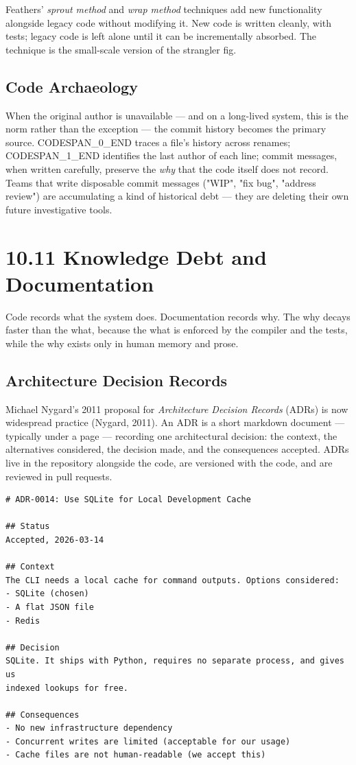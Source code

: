 \documentclass[11pt,a4paper]{book}
\begin{document}
Feathers' \textit{sprout method} and \textit{wrap method} techniques add new functionality alongside legacy code without modifying it. New code is written cleanly, with tests; legacy code is left alone until it can be incrementally absorbed. The technique is the small-scale version of the strangler fig.

\subsection{Code Archaeology}

When the original author is unavailable --- and on a long-lived system, this is the norm rather than the exception --- the commit history becomes the primary source. CODESPAN\_0\_END traces a file's history across renames; CODESPAN\_1\_END identifies the last author of each line; commit messages, when written carefully, preserve the \textit{why} that the code itself does not record. Teams that write disposable commit messages ("WIP", "fix bug", "address review") are accumulating a kind of historical debt --- they are deleting their own future investigative tools.

\medskip

\section{10.11 Knowledge Debt and Documentation}

Code records what the system does. Documentation records why. The why decays faster than the what, because the what is enforced by the compiler and the tests, while the why exists only in human memory and prose.

\subsection{Architecture Decision Records}

Michael Nygard's 2011 proposal for \textit{Architecture Decision Records} (ADRs) is now widespread practice (Nygard, 2011). An ADR is a short markdown document --- typically under a page --- recording one architectural decision: the context, the alternatives considered, the decision made, and the consequences accepted. ADRs live in the repository alongside the code, are versioned with the code, and are reviewed in pull requests.

\begin{lstlisting}
# ADR-0014: Use SQLite for Local Development Cache

## Status
Accepted, 2026-03-14

## Context
The CLI needs a local cache for command outputs. Options considered:
- SQLite (chosen)
- A flat JSON file
- Redis

## Decision
SQLite. It ships with Python, requires no separate process, and gives us
indexed lookups for free.

## Consequences
- No new infrastructure dependency
- Concurrent writes are limited (acceptable for our usage)
- Cache files are not human-readable (we accept this)
\end{lstlisting}
\end{document}
